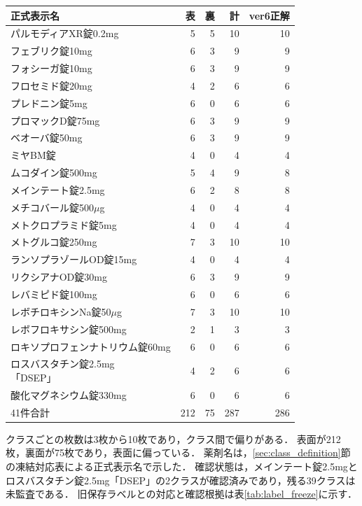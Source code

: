\documentclass[uplatex,dvipdfmx]{jsarticle}
\begin{document}
\begin{table}[H]
\begin{minipage}[t]{0.49\linewidth}
\begin{tabular}{|p{3.55cm}|r|r|r|r|}
      \hline
      正式表示名 & 表 & 裏 & 計 & ver6正解 \\ \hline
      パルモディアXR錠0.2mg & 5 & 5 & 10 & 10 \\ \hline
      フェブリク錠10mg & 6 & 3 & 9 & 9 \\ \hline
      フォシーガ錠10mg & 6 & 3 & 9 & 9 \\ \hline
      フロセミド錠20mg & 4 & 2 & 6 & 6 \\ \hline
      プレドニン錠5mg & 6 & 0 & 6 & 6 \\ \hline
      プロマックD錠75mg & 6 & 3 & 9 & 9 \\ \hline
      ベオーバ錠50mg & 6 & 3 & 9 & 9 \\ \hline
      ミヤBM錠 & 4 & 0 & 4 & 4 \\ \hline
      ムコダイン錠500mg & 5 & 4 & 9 & 8 \\ \hline
      メインテート錠2.5mg & 6 & 2 & 8 & 8 \\ \hline
      メチコバール錠500$\mu$g & 4 & 0 & 4 & 4 \\ \hline
      メトクロプラミド錠5mg & 4 & 0 & 4 & 4 \\ \hline
      メトグルコ錠250mg & 7 & 3 & 10 & 10 \\ \hline
      ランソプラゾールOD錠15mg & 4 & 0 & 4 & 4 \\ \hline
      リクシアナOD錠30mg & 6 & 3 & 9 & 9 \\ \hline
      レバミピド錠100mg & 6 & 0 & 6 & 6 \\ \hline
      レボチロキシンNa錠50$\mu$g & 7 & 3 & 10 & 10 \\ \hline
      レボフロキサシン錠500mg & 2 & 1 & 3 & 3 \\ \hline
      ロキソプロフェンナトリウム錠60mg & 6 & 0 & 6 & 6 \\ \hline
      \shortstack[l]{ロスバスタチン錠2.5mg\\「DSEP」} & 4 & 2 & 6 & 6 \\ \hline
      酸化マグネシウム錠330mg & 6 & 0 & 6 & 6 \\ \hline
      41件合計 & 212 & 75 & 287 & 286 \\ \hline
    \end{tabular}
  \end{minipage}
\end{table}

クラスごとの枚数は3枚から10枚であり，クラス間で偏りがある．
表面が212枚，裏面が75枚であり，表面に偏っている．
薬剤名は，\ref{sec:class_definition}節の凍結対応表による正式表示名で示した．
確認状態は，メインテート錠2.5mgとロスバスタチン錠2.5mg「DSEP」の2クラスが確認済みであり，残る39クラスは未監査である．
旧保存ラベルとの対応と確認根拠は表\ref{tab:label_freeze}に示す．
\end{document}
